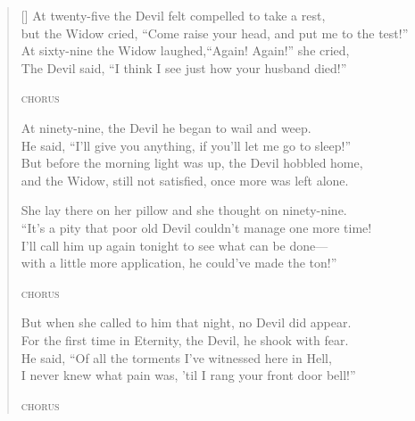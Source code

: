 \begin{verse}[\versewidth]
At twenty-five the Devil felt compelled to take a rest,\\
but the Widow cried, ``Come raise your head, and put me to the test!''\\
At sixty-nine the Widow laughed,``Again! Again!'' she cried,\\
The Devil said, ``I think I see just how your husband died!''

\textsc{chorus}

At ninety-nine, the Devil he began to wail and weep.\\
He said, ``I'll give you anything, if you'll let me go to sleep!''\\
But before the morning light was up, the Devil hobbled home,\\
and the Widow, still not satisfied, once more was left alone.

\pagebreak

She lay there on her pillow and she thought on ninety-nine.\\
``It's a pity that poor old Devil couldn't manage one more time!\\
I'll call him up again tonight to see what can be done---\\
with a little more application, he could've made the ton!''

\textsc{chorus}

But when she called to him that night, no Devil did appear.\\
For the first time in Eternity, the Devil, he shook with fear.\\
He said, ``Of all the torments I've witnessed here in Hell,\\
I never knew what pain was, 'til I rang your front door bell!''

\textsc{chorus}

\end{verse}
